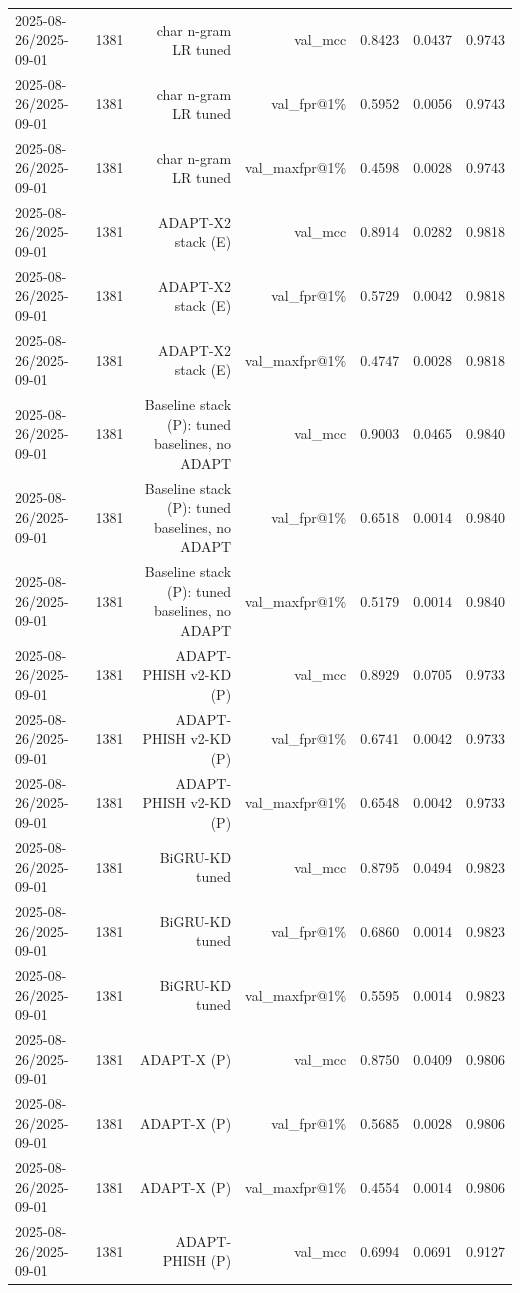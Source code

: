 \begin{table}[t]
\begin{tabular}{llrrrrr}
2025-08-26/2025-09-01 & 1381 & char n-gram LR tuned & val\_mcc & 0.8423 & 0.0437 & 0.9743 \\
2025-08-26/2025-09-01 & 1381 & char n-gram LR tuned & val\_fpr@1\% & 0.5952 & 0.0056 & 0.9743 \\
2025-08-26/2025-09-01 & 1381 & char n-gram LR tuned & val\_maxfpr@1\% & 0.4598 & 0.0028 & 0.9743 \\
2025-08-26/2025-09-01 & 1381 & ADAPT-X2 stack (E) & val\_mcc & 0.8914 & 0.0282 & 0.9818 \\
2025-08-26/2025-09-01 & 1381 & ADAPT-X2 stack (E) & val\_fpr@1\% & 0.5729 & 0.0042 & 0.9818 \\
2025-08-26/2025-09-01 & 1381 & ADAPT-X2 stack (E) & val\_maxfpr@1\% & 0.4747 & 0.0028 & 0.9818 \\
2025-08-26/2025-09-01 & 1381 & Baseline stack (P): tuned baselines, no ADAPT & val\_mcc & 0.9003 & 0.0465 & 0.9840 \\
2025-08-26/2025-09-01 & 1381 & Baseline stack (P): tuned baselines, no ADAPT & val\_fpr@1\% & 0.6518 & 0.0014 & 0.9840 \\
2025-08-26/2025-09-01 & 1381 & Baseline stack (P): tuned baselines, no ADAPT & val\_maxfpr@1\% & 0.5179 & 0.0014 & 0.9840 \\
2025-08-26/2025-09-01 & 1381 & ADAPT-PHISH v2-KD (P) & val\_mcc & 0.8929 & 0.0705 & 0.9733 \\
2025-08-26/2025-09-01 & 1381 & ADAPT-PHISH v2-KD (P) & val\_fpr@1\% & 0.6741 & 0.0042 & 0.9733 \\
2025-08-26/2025-09-01 & 1381 & ADAPT-PHISH v2-KD (P) & val\_maxfpr@1\% & 0.6548 & 0.0042 & 0.9733 \\
2025-08-26/2025-09-01 & 1381 & BiGRU-KD tuned & val\_mcc & 0.8795 & 0.0494 & 0.9823 \\
2025-08-26/2025-09-01 & 1381 & BiGRU-KD tuned & val\_fpr@1\% & 0.6860 & 0.0014 & 0.9823 \\
2025-08-26/2025-09-01 & 1381 & BiGRU-KD tuned & val\_maxfpr@1\% & 0.5595 & 0.0014 & 0.9823 \\
2025-08-26/2025-09-01 & 1381 & ADAPT-X (P) & val\_mcc & 0.8750 & 0.0409 & 0.9806 \\
2025-08-26/2025-09-01 & 1381 & ADAPT-X (P) & val\_fpr@1\% & 0.5685 & 0.0028 & 0.9806 \\
2025-08-26/2025-09-01 & 1381 & ADAPT-X (P) & val\_maxfpr@1\% & 0.4554 & 0.0014 & 0.9806 \\
2025-08-26/2025-09-01 & 1381 & ADAPT-PHISH (P) & val\_mcc & 0.6994 & 0.0691 & 0.9127 \\

\end{tabular}
\end{table}
